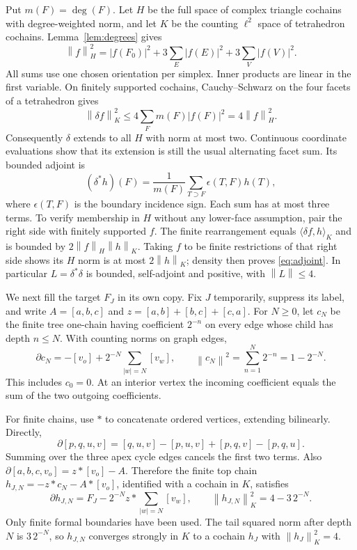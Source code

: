 \documentclass[11pt]{article}
\newcommand{\degf}{\operatorname{deg}}
\newcommand{\norm}[1]{\left\lVert#1\right\rVert}
\newcommand{\ip}[2]{\langle#1,#2\rangle}
\begin{document}
Put $m(F)=\degf(F)$. Let $H$ be the full space of complex triangle cochains
with degree-weighted norm, and let $K$ be the counting $\ell^2$ space of
tetrahedron cochains. Lemma~\ref{lem:degrees} gives
\begin{equation}\label{eq:Hpartition}
 \norm{f}_H^2=|f(F_0)|^2+3\sum_E|f(E)|^2+3\sum_V|f(V)|^2.
\end{equation}
All sums use one chosen orientation per simplex. Inner products are linear
in the first variable. On finitely supported cochains, Cauchy--Schwarz on
the four facets of a tetrahedron gives
\begin{equation}\label{eq:bounded}
 \norm{\delta f}_K^2\leq4\sum_Fm(F)|f(F)|^2=4\norm{f}_H^2.
\end{equation}
Consequently $\delta$ extends to all $H$ with norm at most two. Continuous
coordinate evaluations show that its extension is still the usual
alternating facet sum. Its bounded adjoint is
\begin{equation}\label{eq:adjoint}
 (\delta^*h)(F)=\frac1{m(F)}
     \sum_{T\supset F}\epsilon(T,F)h(T),
\end{equation}
where $\epsilon(T,F)$ is the boundary incidence sign. Each sum has at most
three terms. To verify membership in $H$ without any lower-face assumption,
pair the right side with finitely supported $f$. The finite rearrangement
equals $\ip{\delta f}{h}_K$ and is bounded by
$2\norm{f}_H\norm{h}_K$. Taking $f$ to be finite restrictions of that right
side shows its $H$ norm is at most $2\norm{h}_K$; density then proves
\eqref{eq:adjoint}. In particular $L=\delta^*\delta$ is bounded,
self-adjoint and positive, with $\norm{L}\leq4$.

We next fill the target $F_J$ in its own copy. Fix $J$ temporarily, suppress
its label, and write $A=[a,b,c]$ and
$z=[a,b]+[b,c]+[c,a]$. For $N\geq0$, let $c_N$ be the finite tree
one-chain having coefficient $2^{-n}$ on every edge whose child has depth
$n\leq N$. With counting norms on graph edges,
\begin{equation}\label{eq:treeflow}
 \partial c_N=-[v_o]+2^{-N}\sum_{|w|=N}[v_w],
 \qquad \norm{c_N}^2=\sum_{n=1}^N2^{-n}=1-2^{-N}.
\end{equation}
This includes $c_0=0$. At an interior vertex the incoming coefficient equals
the sum of the two outgoing coefficients.

For finite chains, use $*$ to concatenate ordered vertices, extending
bilinearly. Directly,
\[
 \partial[p,q,u,v]=[q,u,v]-[p,u,v]+[p,q,v]-[p,q,u].
\]
Summing over the three apex cycle edges cancels the first two terms. Also
$\partial[a,b,c,v_o]=z*[v_o]-A$. Therefore the finite top chain
$h_{J,N}=-z*c_N-A*[v_o]$, identified with a cochain in $K$, satisfies
\begin{equation}\label{eq:finitefilling}
 \partial h_{J,N}=F_J-2^{-N}z*\sum_{|w|=N}[v_w],
 \qquad \norm{h_{J,N}}_K^2=4-3\,2^{-N}.
\end{equation}
Only finite formal boundaries have been used. The tail squared norm after
depth $N$ is $3\,2^{-N}$, so $h_{J,N}$ converges strongly in $K$ to a
cochain $h_J$ with $\norm{h_J}_K^2=4$.
\end{document}
